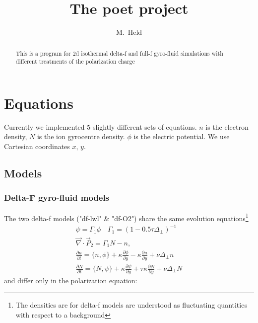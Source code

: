 





\title{The poet project}
\author{M.~Held}
\maketitle

\begin{abstract}
  This is a program for 2d isothermal delta-f and full-f gyro-fluid simulations with different treatments of the polarization charge
\end{abstract}

\section{Equations}
Currently we implemented $5$ slightly different sets of equations. $n$ is the electron density, $N$ is the ion gyrocentre density. $\phi$ is the electric potential. We
use Cartesian coordinates $x$, $y$.
\subsection{Models}
\subsubsection{Delta-F gyro-fluid models}
The two delta-f models ("df-lwl" \& "df-O2") share the same evolution equations\footnote{The densities are for delta-f models are understood as fluctuating quantities with respect to a background} 
\begin{subequations}
\begin{align}
\psi = \Gamma_1 \phi \quad \Gamma_1 = ( 1- 0.5\tau\Delta_{\perp})^{-1} \\
 \vec{\nabla}\cdot \vec{P}_2=  \Gamma_1 N -n, \\
 \frac{\partial n}{\partial t}     = 
    \{ n, \phi\} 
  + \kappa \frac{\partial \phi}{\partial y} 
  -\kappa \frac{\partial n}{\partial y}
  + \nu \Delta_{\perp} n  \\
  \frac{\partial N}{\partial t} =
  \{ N, \psi\} 
  + \kappa \frac{\partial \psi}{\partial y} 
  + \tau \kappa\frac{\partial N}{\partial y} +\nu\Delta_{\perp}N
\end{align}
\end{subequations}
and differ only in the polarization equation:\\

